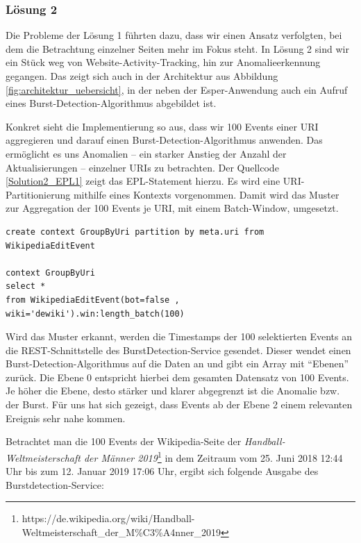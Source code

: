 \subsubsection{Lösung 2}
Die Probleme der Lösung 1 führten dazu, dass wir einen Ansatz verfolgten, bei dem die Betrachtung einzelner Seiten mehr im Fokus steht.
In Lösung 2 sind wir ein Stück weg von Website-Activity-Tracking, hin zur Anomalieerkennung gegangen. Das zeigt sich auch in der
Architektur aus Abbildung \ref{fig:architektur_uebersicht}, in der neben der Esper-Anwendung auch ein Aufruf eines
Burst-Detection-Algorithmus abgebildet ist.

Konkret sieht die Implementierung so aus, dass wir 100 Events einer URI aggregieren und darauf einen Burst-Detection-Algorithmus anwenden.
Das ermöglicht es uns Anomalien -- ein starker Anstieg der Anzahl der Aktualisierungen -- einzelner URIs zu betrachten.
Der Quellcode \ref{Solution2_EPL1} zeigt das EPL-Statement hierzu. Es wird eine URI-Partitionierung mithilfe eines
Kontexts vorgenommen. Damit wird das Muster zur Aggregation der 100 Events je URI, mit einem Batch-Window, umgesetzt.

\begin{lstlisting}[label=Solution2_EPL1,caption=Lösung 2: EPL-Statement 2,language=epl,firstnumber=1,captionpos=b]
create context GroupByUri partition by meta.uri from WikipediaEditEvent

context GroupByUri
select *
from WikipediaEditEvent(bot=false , wiki='dewiki').win:length_batch(100)
\end{lstlisting}

Wird das Muster erkannt, werden die Timestamps der 100 selektierten Events an die REST-Schnittstelle des BurstDetection-Service gesendet.
Dieser wendet einen Burst-Detection-Algorithmus auf die Daten an und gibt ein Array mit \textquotedblleft{}Ebenen\textquotedblright{} zurück.
Die Ebene 0 entspricht hierbei dem gesamten Datensatz von 100 Events. Je höher die Ebene, desto stärker und klarer abgegrenzt ist die
Anomalie bzw. der Burst. Für uns hat sich gezeigt, dass Events ab der Ebene 2 einem relevanten Ereignis sehr nahe kommen.

Betrachtet man die 100 Events der Wikipedia-Seite der \textit{Handball-Weltmeisterschaft der Männer 2019}\footnote{https://de.wikipedia.org/wiki/Handball-Weltmeisterschaft\newline{}\_der\_M\%C3\%A4nner\_2019}
in dem Zeitraum vom 25. Juni 2018 12:44 Uhr bis zum 12. Januar 2019 17:06 Uhr, ergibt sich folgende Ausgabe des Burstdetection-Service:

